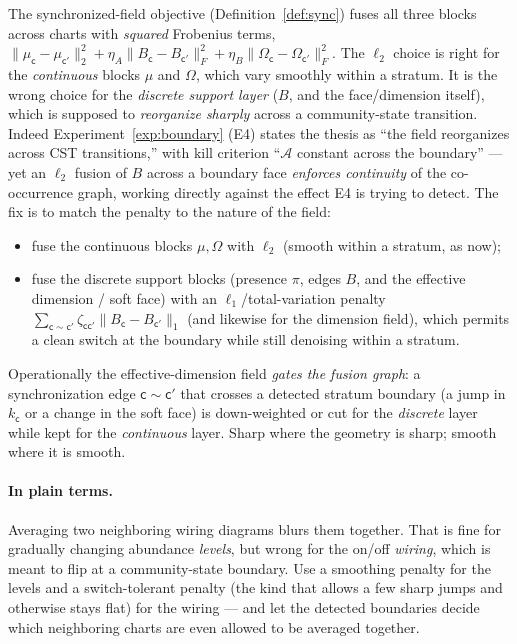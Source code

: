 \documentclass[11pt]{article}
\theoremstyle{definition}
\theoremstyle{plain}
\theoremstyle{remark}
\newcommand{\1}{\mathbf{1}}
\newcommand{\Prec}{\Omega}
\newcommand{\Pres}{\pi}
\newcommand{\Edge}{B}
\newcommand{\Field}{\mathcal{A}}
\newcommand{\cc}{\mathsf{c}}              %
\newcommand{\norm}[1]{\lVert #1 \rVert}
\begin{document}
The synchronized-field objective (Definition~\ref{def:sync}) fuses all three
blocks across charts with \emph{squared} Frobenius terms,
$\norm{\mu_\cc-\mu_{\cc'}}_2^2+\eta_A\norm{\Edge_\cc-\Edge_{\cc'}}_F^2
+\eta_B\norm{\Prec_\cc-\Prec_{\cc'}}_F^2$. The $\ell_2$ choice is right for the
\emph{continuous} blocks $\mu$ and $\Prec$, which vary smoothly within a stratum.
It is the wrong choice for the \emph{discrete support layer} ($\Edge$, and the
face/dimension itself), which is supposed to \emph{reorganize sharply} across a
community-state transition. Indeed Experiment~\ref{exp:boundary} (E4) states the
thesis as ``the field reorganizes across CST transitions,'' with kill criterion
``$\Field$ constant across the boundary'' --- yet an $\ell_2$ fusion of $\Edge$
across a boundary face \emph{enforces continuity} of the co-occurrence graph,
working directly against the effect E4 is trying to detect. The fix is to match
the penalty to the nature of the field:
\begin{itemize}[leftmargin=1.4em]
\item fuse the continuous blocks $\mu,\Prec$ with $\ell_2$ (smooth within a
  stratum, as now);
\item fuse the discrete support blocks (presence $\Pres$, edges $\Edge$, and the
  effective dimension / soft face) with an $\ell_1$/total-variation penalty
  $\sum_{\cc\sim\cc'}\zeta_{\cc\cc'}\norm{\Edge_\cc-\Edge_{\cc'}}_1$ (and likewise
  for the dimension field), which permits a clean switch at the boundary while
  still denoising within a stratum.
\end{itemize}
Operationally the effective-dimension field \emph{gates the fusion graph}: a
synchronization edge $\cc\sim\cc'$ that crosses a detected stratum boundary (a
jump in $k_\cc$ or a change in the soft face) is down-weighted or cut for the
\emph{discrete} layer while kept for the \emph{continuous} layer. Sharp where the
geometry is sharp; smooth where it is smooth.

\paragraph{In plain terms.}
Averaging two neighboring wiring diagrams blurs them together. That is fine for
gradually changing abundance \emph{levels}, but wrong for the on/off
\emph{wiring}, which is meant to flip at a community-state boundary. Use a
smoothing penalty for the levels and a switch-tolerant penalty (the kind that
allows a few sharp jumps and otherwise stays flat) for the wiring --- and let the
detected boundaries decide which neighboring charts are even allowed to be
averaged together.
\end{document}
